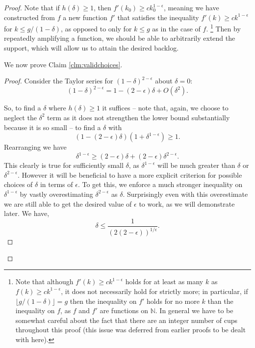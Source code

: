 \documentclass[twocolumn]{article}[10pt]
\begin{document}
\begin{proof}
  Note that if $h(\delta)\ge 1$, then $f'(k_0) \ge c k_0^{1-\epsilon}$, meaning
  we have constructed from $f$ a new function $f'$ that satisfies the
  inequality $f'(k) \ge ck^{1-\epsilon}$ for $k\le g/(1-\delta)$, as opposed to
  only for $k \le g$ as in the case of $f$. 
  \footnote{Note that although $f'(k) \ge ck^{1-\epsilon}$ holds for at least
    as many $k$ as $f(k) \ge c k^{1-\epsilon}$, it does not necessarily hold
    for strictly more; in particular, if $\lfloor g/(1-\delta) \rfloor = g$
    then the inequality on $f'$ holds for no more $k$ than the inequality on
    $f$, as $f$ and $f'$ are functions on $\mathbb{N}$. In general we have to
    be somewhat careful about the fact that there are an integer number of cups
    throughout this proof (this issue was deferred from earlier proofs to be
  dealt with here).} 
  Then by repeatedly amplifying a function, we should be able to arbitrarily
  extend the support, which will allow us to attain the desired backlog.

  We now prove Claim \ref{clm:validchoices}.
  \begin{proof}
  Consider the Taylor series for $(1-\delta)^{2-\epsilon}$ about $\delta = 0$:
  $$(1-\delta)^{2-\epsilon} = 1 - (2-\epsilon)\delta + O(\delta^2).$$
 
  So, to find a $\delta$ where $h(\delta) \ge 1$ it suffices -- note that, again, we choose
  to neglect the $\delta^2$ term as it does not strengthen the lower bound substantially because
  it is so small -- to find a $\delta$ with 
  $$(1-(2-\epsilon)\delta)(1+\delta^{1-\epsilon}) \ge 1.$$
  Rearranging we have 
  $$\delta^{1-\epsilon} \ge (2-\epsilon)\delta + (2-\epsilon)\delta^{2-\epsilon}.$$
  This clearly is true for sufficiently small $\delta$, as
  $\delta^{1-\epsilon}$ will be much greater than $\delta$ or
  $\delta^{2-\epsilon}$.
  However it will be beneficial to have a more explicit criterion for possible
  choices of $\delta$ in terms of $\epsilon$. To get this, we enforce a much
  stronger inequality on $\delta^{1-\epsilon}$ by vastly overestimating
  $\delta^{2-\epsilon}$ as $\delta$. Surprisingly even with this overestimate
  we are still able to get the desired value of $\epsilon$ to work, as we will demonstrate later.
  We have,
  \begin{equation}
    \label{eqn:deltaUpperIneq}
    \delta \le \frac{1}{(2(2-\epsilon))^{1/\epsilon}}. 
  \end{equation}


\end{proof}
\end{proof}
\end{document}
